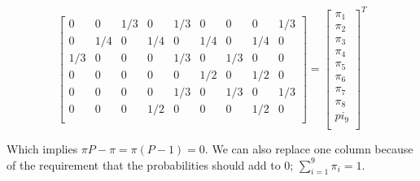 \begin{equation*}
\begin{bmatrix}
          0 &         0  &  1/3       &  0   & 1/3       &  0       &  0       &  0  &  1/3 \\
          0 &    1/4       &  0  &  1/4   &      0  &  1/4       &  0  &  1/4  &       0 \\
     1/3 &         0       &  0       &  0  &  1/3   &      0  &  1/3       &  0  &       0 \\
          0 &         0  &       0       &  0       &  0  &  1/2       &  0  &  1/2  &       0 \\
          0 &         0       &  0       &  0   & 1/3       &  0  &  1/3       &  0  &  1/3 \\
          0 &         0     &    0   & 1/2       &  0        & 0       &  0  &  1/2  &       0 \\ 
\end{bmatrix}
= 
\begin{bmatrix}
  \pi_1 \\  \pi_2 \\  \pi_3 \\  \pi_4 \\  \pi_5 \\  \pi_6 \\  \pi_7 \\  \pi_8 \\  pi_9\\
\end{bmatrix}^T
\end{equation*}

Which implies $\pi P - \pi = \pi (P - 1) = 0$. We can also replace one column because of the requirement that the probabilities should add to 0; $\sum^9_{i=1} \pi_i = 1$.

